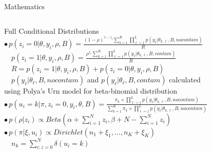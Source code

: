\documentclass[letter,graphicx]{beamer}
\begin{document}
\begin{frame}{Mathematics}
\begin{tiny}
\begin{columns}[T]
Full Conditional Distributions \\ \vspace{1mm}
$\bullet \, p(z_i=0|\theta,y_i,\rho,B) = \frac{(1-\rho)^{1-z_i}\sum_{k=1}^{K} \prod_{\ell=1}^{L} p(y_{\ell}|\theta_{k,\ell},B,nocontam)}{R}$ \\ 
\vspace{1mm}
$\quad p(z_i=1|\theta,y_i,\rho,B) = \frac{\rho^{z_i}\sum_{k=1}^{K} \prod_{\ell=1}^{L} p(y_{\ell}|\theta_{k,\ell},B,contam)}{R}$ \\
 \vspace{1mm}
$\quad R = p(z_i=1|\theta,y_i,\rho,B) + p(z_i = 0|\theta,y_i,\rho,B)$ \\ 
\vspace{1mm}
$\quad p(y_{\ell} |\theta_{\ell},B,nocontam)$ and $p(y_{\ell} |\theta_{\ell},B,contam)$ calculated \\
\vspace{1mm}
\quad using Polya's Urn model for beta-binomial distribution \\
\vspace{1mm}
$\bullet \, p(u_i = k|\pi,z_i=0,y_i,\theta,B) = \frac{\pi_k \times \prod_{\ell=1}^{L} p(y_{\ell}|\theta_{k,\ell},B,nocontam)}{\sum_{k=1}^{K} \pi_k \times \prod_{\ell=1}^{L} p(y_{\ell}|\theta_{k,\ell},B,nocontam)}$ \\
\vspace{1mm}
$\bullet \, p(\rho|z_i) \propto Beta(\alpha + \sum_{i=1}^{N} z_i, \beta + N - \sum_{i=1}^{N} z_i)$ \\ \vspace{1mm}
$\bullet \, p(\pi|\xi,u_i) \propto Dirichlet(n_1 + \xi_1, \ldots, n_K + \xi_K)$ \\
\vspace{1mm}
$\quad n_k = \sum_{i:z=0}^{N} \delta(u_{i} = k)$
\end{columns}
\end{tiny}
\end{frame} 
\end{document}
